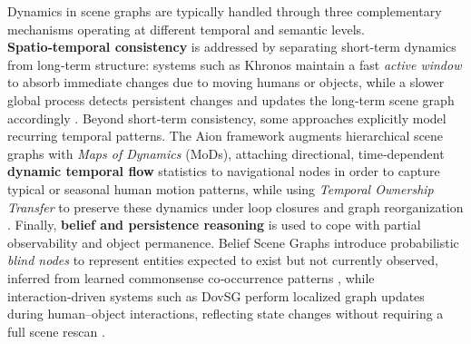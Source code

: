 Dynamics in scene graphs are typically handled through three complementary mechanisms operating at different temporal and semantic levels. 
\textbf{Spatio‑temporal consistency} is addressed by separating short‑term dynamics from long‑term structure: systems such as Khronos maintain a fast \textit{active window} to absorb immediate changes due to moving humans or objects, while a slower global process detects persistent changes and updates the long‑term scene graph accordingly \cite{schmid_khronos_2024}. 
Beyond short‑term consistency, some approaches explicitly model recurring temporal patterns. 
The Aion framework augments hierarchical scene graphs with \textit{Maps of Dynamics} (MoDs), attaching directional, time‑dependent \textbf{dynamic temporal flow} statistics to navigational nodes in order to capture typical or seasonal human motion patterns, while using \textit{Temporal Ownership Transfer} to preserve these dynamics under loop closures and graph reorganization \cite{catalano_aion_2025}. 
Finally, \textbf{belief and persistence reasoning} is used to cope with partial observability and object permanence. 
Belief Scene Graphs introduce probabilistic \textit{blind nodes} to represent entities expected to exist but not currently observed, inferred from learned commonsense co‑occurrence patterns \cite{saucedo_estimating_2025}, while interaction‑driven systems such as DovSG perform localized graph updates during human–object interactions, reflecting state changes without requiring a full scene rescan \cite{yan_dynamic_2025}.
